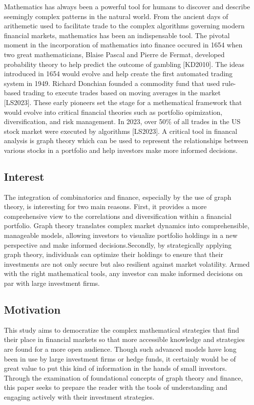 \documentclass{article}
\begin{document}
Mathematics has always been a powerful tool for humans to discover and describe seemingly complex patterns in the natural world. From the ancient days of arithemetic used to facilitate trade to the complex algorithms governing modern financial markets, mathematics has been an indispensable tool. The pivotal moment in the incorporation of mathematics into finance occured in 1654 when two great mathematicians, Blaise Pascal and Pierre de Fermat, developed probability theory to help predict the outcome of gambling [KD2010]. The ideas introduced in 1654 would evolve and help create the first automated trading system in 1949. Richard Donchian founded a commodity fund that used rule-based trading to execute trades based on moving averages in the market [LS2023]. These early pioneers set the stage for a methematical framework that would evolve into critical financial theories such as portfolio opimization, diversification, and risk management. In 2023, over 50\% of all trades in the US stock market were executed by algorithms [LS2023]. A critical tool in financal analysis is graph theory which can be used to represent the relationships between various stocks in a portfolio and help investors make more informed decisions.



\subsection{Interest}

The integration of combinatorics and finance, especially by the use of graph theory, is interesting for two main reasons. First, it provides a more comprehensive view to the correlations and diversification within a financial portfolio. Graph theory translates complex market dynamics into comprehensible, manageable models, allowing investors to visualize portfolio holdings in a new perspective and make informed decisions.Secondly, by strategically applying graph theory, individuals can optimize their holdings to ensure that their investments are not only secure but also resilient against market volatility. Armed with the right mathematical tools, any investor can make informed decisions on par with large investment firms.

\subsection{Motivation}

This study aims to democratize the complex mathematical strategies that find their place in financial markets so that more accessible knowledge and strategies are found for a more open audience. Though such advanced models have long been in use by large investment firms or hedge funds, it certainly would be of great value to put this kind of information in the hands of small investors. Through the examination of foundational concepts of graph theory and finance, this paper seeks to prepare the reader with the tools of understanding and engaging actively with their investment strategies.
\end{document}
